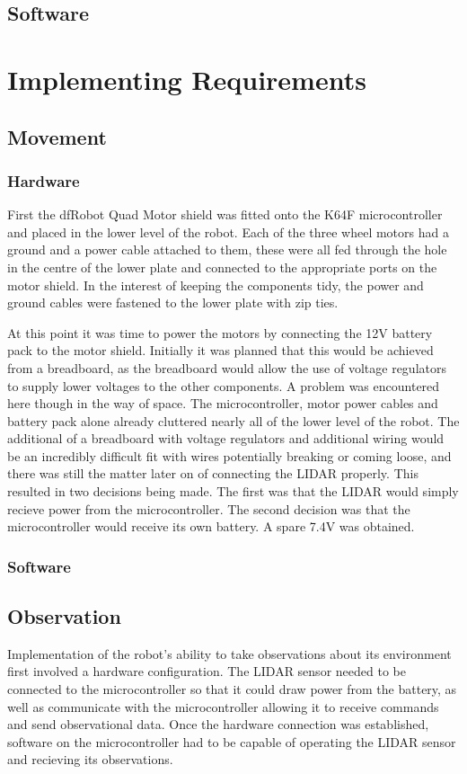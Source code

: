 			
			
			\subsection{Software}
		\section{Implementing Requirements}
			\subsection{Movement}
				\subsubsection{Hardware}
				First the dfRobot Quad Motor shield was fitted onto the K64F microcontroller and placed in the lower level of the robot. Each of the three wheel motors had a ground and a power cable attached to them, these were all fed through the hole in the centre of the lower plate and connected to the appropriate ports on the motor shield. In the interest of keeping the components tidy, the power and ground cables were fastened to the lower plate with zip ties.
				
				At this point it was time to power the motors by connecting the 12V battery pack to the motor shield. Initially it was planned that this would be achieved from a breadboard, as the breadboard would allow the use of voltage regulators to supply lower voltages to the other components. A problem was encountered here though in the way of space. The microcontroller, motor power cables and battery pack alone already cluttered nearly all of the lower level of the robot. The additional of a breadboard with voltage regulators and additional wiring would be an incredibly difficult fit with wires potentially breaking or coming loose, and there was still the matter later on of connecting the LIDAR properly. This resulted in two decisions being made. The first was that the LIDAR would simply recieve power from the microcontroller. The second decision was that the microcontroller would receive its own battery. A spare 7.4V was obtained.
				
				\subsubsection{Software}
				
			\subsection{Observation}
			Implementation of the robot's ability to take observations about its environment first involved a hardware configuration. The LIDAR sensor needed to be connected to the microcontroller so that it could draw power from the battery, as well as communicate with the microcontroller allowing it to receive commands and send observational data. Once the hardware connection was established, software on the microcontroller had to be capable of operating the LIDAR sensor and recieving its observations.
